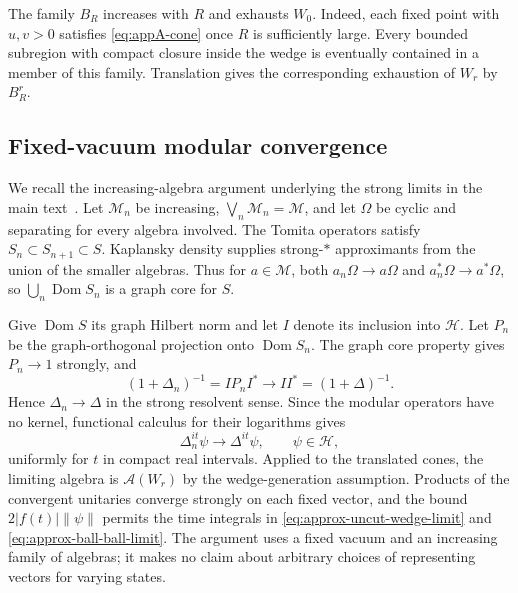 \documentclass[a4paper,11pt]{article}
\theoremstyle{definition}
\begin{document}
The family $B_R$ increases with $R$ and exhausts $W_0$. Indeed, each fixed point with $u,v>0$ satisfies \eqref{eq:appA-cone} once $R$ is sufficiently large. Every bounded subregion with compact closure inside the wedge is eventually contained in a member of this family. Translation gives the corresponding exhaustion of $W_r$ by $B^r_R$.

\subsection{Fixed-vacuum modular convergence}\label{app:convergence}

We recall the increasing-algebra argument underlying the strong limits in the main text~\cite{revolutionizing,takesaki2}. Let $\mathcal M_n$ be increasing, $\bigvee_n\mathcal M_n=\mathcal M$, and let $\Omega$ be cyclic and separating for every algebra involved. The Tomita operators satisfy $S_n\subset S_{n+1}\subset S$. Kaplansky density supplies strong-$*$ approximants from the union of the smaller algebras. Thus for $a\in\mathcal M$, both $a_n\Omega\to a\Omega$ and $a_n^*\Omega\to a^*\Omega$, so $\bigcup_n\operatorname{Dom}S_n$ is a graph core for $S$.

Give $\operatorname{Dom}S$ its graph Hilbert norm and let $I$ denote its inclusion into $\mathcal H$. Let $P_n$ be the graph-orthogonal projection onto $\operatorname{Dom}S_n$. The graph core property gives $P_n\to1$ strongly, and
\begin{equation}
 (1+\Delta_n)^{-1}=IP_nI^*\longrightarrow II^*=(1+\Delta)^{-1}.
 \label{eq:appA-resolvent}
\end{equation}
Hence $\Delta_n\to\Delta$ in the strong resolvent sense. Since the modular operators have no kernel, functional calculus for their logarithms gives
\begin{equation}
 \Delta_n^{it}\psi\longrightarrow\Delta^{it}\psi,\qquad\psi\in\mathcal H,
 \label{eq:appA-unitary}
\end{equation}
uniformly for $t$ in compact real intervals. Applied to the translated cones, the limiting algebra is $\mathcal A(W_r)$ by the wedge-generation assumption. Products of the convergent unitaries converge strongly on each fixed vector, and the bound $2|f(t)|\|\psi\|$ permits the time integrals in \eqref{eq:approx-uncut-wedge-limit} and \eqref{eq:approx-ball-ball-limit}. The argument uses a fixed vacuum and an increasing family of algebras; it makes no claim about arbitrary choices of representing vectors for varying states.
\end{document}
